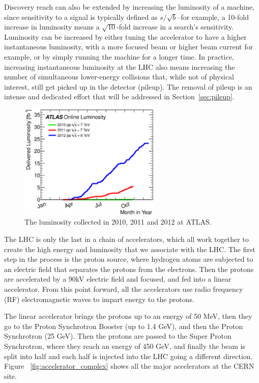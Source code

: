 Discovery reach can also be extended by increasing the luminosity of a machine, 
since sensitivity to a signal is typically defined as $s/\sqrt{b}$--for example, a 
10-fold increase in luminosity means a $\sqrt{10}$-fold increase in a search's sensitivity.  
Luminosity can be increased by either tuning the accelerator to have a higher instantaneous luminosity, with a more focused 
beam or higher beam current for example, or by simply running the machine for a longer time.  In 
practice, increasing instantaneous luminosity at the LHC also means increasing the number of simultaneous 
lower-energy collisions that, while not of physical interest, still get picked up in the detector (pileup).  
The removal of pileup is an intense and dedicated effort that will be addressed in Section~\ref{sec:pileup}.



\begin{figure}
	\centering
	\includegraphics[width=0.6\textwidth]{ATLASDetector/images/intlumivsyear.eps}
	\caption{The luminosity collected in 2010, 2011 and 2012 at ATLAS. \label{fig:lumi_vs_year}}
\end{figure}



The LHC is only the last in a chain of accelerators, which all work together to create the high 
energy and luminosity that we associate with the LHC.  The first step in the process is the proton source, 
where hydrogen atoms are subjected to an electric field that separates the protons from the electrons.  Then the 
protons are accelerated by a 90kV electric field and focused, and fed into a linear accelerator.  From this point 
forward, all the accelerators use radio frequency (RF) electromagnetic waves to impart energy to the protons.  

The linear accelerator brings the protons up to an energy of 50 MeV, then they go to the Proton 
Synchrotron Booster (up to 1.4 GeV), and then the Proton Synchrotron (25 GeV).  Then 
the protons are passed to the Super Proton Synchrotron, where they reach an energy of 450 GeV, and 
finally the beam is split into half and each half is injected into the LHC going a different direction.  
Figure ~\ref{fig:accelerator_complex} shows all the major accelerators at the CERN site.



